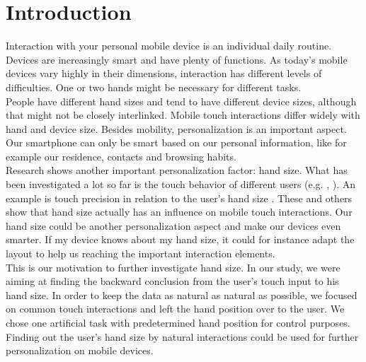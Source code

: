 \documentclass{sigchi}
\begin{document}
\section{Introduction}
Interaction with your personal mobile device is an individual daily routine. Devices are increasingly smart and have plenty of functions. As today's mobile devices vary highly in their dimensions, interaction has different levels of difficulties. One or two hands might be necessary for different tasks.\\
People have different hand sizes and tend to have different device sizes, although that might not be closely interlinked. Mobile touch interactions differ widely with hand and device size. Besides mobility, personalization is an important aspect. Our smartphone can only be smart based on our personal information, like for example our residence, contacts and browsing habits.\\ %
Research shows another important personalization factor: hand size. What has been investigated a lot so far is the touch behavior of different users (e.g. \cite{parhi2006target}, \cite{buschek2015touchml}). An example is touch precision in relation to the user's hand size \cite{parhi2006target}. These and others show that hand size actually has an influence on mobile touch interactions. Our hand size could be another personalization aspect and make our devices even smarter. If my device knows about my hand size, it could for instance adapt the layout to help us reaching the important interaction elements.\\
This is our motivation to further investigate hand size. In our study, we were aiming at finding the backward conclusion from the user's touch input to his hand size. In order to keep the data as natural as natural as possible, we focused on common touch interactions and left the hand position over to the user. We chose one artificial task with predetermined hand position for control purposes. Finding out the user's hand size by natural interactions could be used for further personalization on mobile devices.
\end{document}
